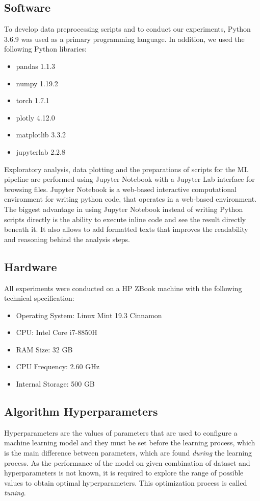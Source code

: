 \subsection{Software}
To develop data preprocessing scripts and to conduct our experiments, Python 3.6.9 was used as a primary programming language. In addition, we used the following Python libraries: 

\begin{itemize}
    \item pandas 1.1.3
    \item numpy 1.19.2
    \item torch 1.7.1
    \item plotly 4.12.0
    \item matplotlib 3.3.2
    \item jupyterlab 2.2.8
\end{itemize}

Exploratory analysis, data plotting and the preparations of scripts for the ML pipeline are performed using Jupyter Notebook with a Jupyter Lab interface for browsing files. Jupyter Notebook is a web-based interactive computational environment for writing python code, that operates in a web-based environment. The biggest advantage in using Jupyter Notebook instead of writing Python scripts directly is the ability to execute inline code and see the result directly beneath it. It also allows to add formatted texts that improves the readability and reasoning behind the analysis steps.

\subsection{Hardware}
All experiments were conducted on a HP ZBook machine with the following technical specification:
\begin{itemize}
    \item Operating System: Linux Mint 19.3 Cinnamon
    \item CPU: Intel Core i7-8850H
    \item RAM Size: 32 GB
    \item CPU Frequency: 2.60 GHz
    \item Internal Storage: 500 GB
\end{itemize}

\subsection{Algorithm Hyperparameters}
Hyperparameters are the values of parameters that are used to configure a machine learning model and they must be set before the learning process, which is the main difference between parameters, which are found \textit{during} the learning process. As the performance of the model on given combination of dataset and hyperparameters is not known, it is required to explore the range of possible values to obtain optimal hyperparameters. This optimization process is called \textit{tuning}.

